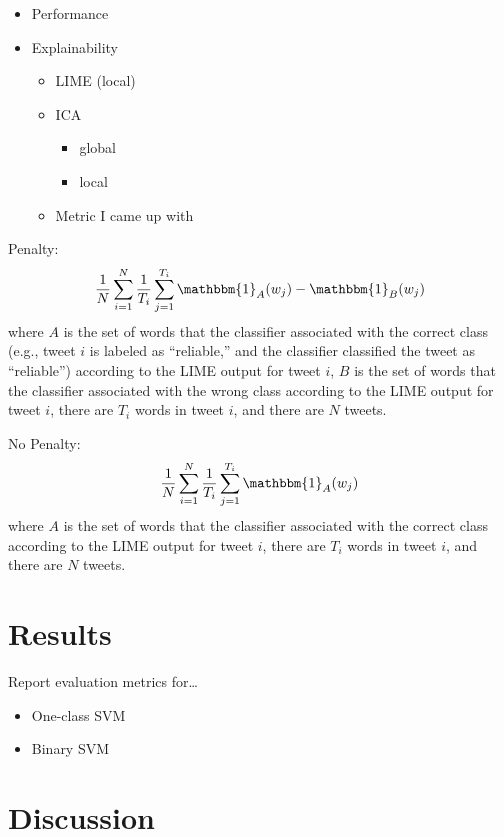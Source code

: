 \documentclass{article}
\begin{document}
\begin{itemize}
\tightlist
\item
  Performance
\item
  Explainability

  \begin{itemize}
  \tightlist
  \item
    LIME (local)
  \item
    ICA

    \begin{itemize}
    \tightlist
    \item
      global
    \item
      local
    \end{itemize}
  \item
    Metric I came up with
  \end{itemize}
\end{itemize}

Penalty: \[
\frac{1}{N} \sum_{i=1}^{N} \frac{1}{T_i} \sum_{j=1}^{T_i} \mathbbm{1}_A(w_j) - \mathbbm{1}_B(w_j)
\] where \(A\) is the set of words that the classifier associated with
the correct class (e.g., tweet \(i\) is labeled as ``reliable,'' and the
classifier classified the tweet as ``reliable'') according to the LIME
output for tweet \(i\), \(B\) is the set of words that the classifier
associated with the wrong class according to the LIME output for tweet
\(i\), there are \(T_i\) words in tweet \(i\), and there are \(N\)
tweets.

No Penalty: \[
\frac{1}{N} \sum_{i=1}^{N} \frac{1}{T_i} \sum_{j=1}^{T_i} \mathbbm{1}_A(w_j)
\] where \(A\) is the set of words that the classifier associated with
the correct class according to the LIME output for tweet \(i\), there
are \(T_i\) words in tweet \(i\), and there are \(N\) tweets.

\hypertarget{results}{%
\section{Results}\label{results}}

\label{sec:results} Report evaluation metrics for\ldots{}

\begin{itemize}
\tightlist
\item
  One-class SVM
\item
  Binary SVM
\end{itemize}

\hypertarget{discussion}{%
\section{Discussion}\label{discussion}}
\end{document}
